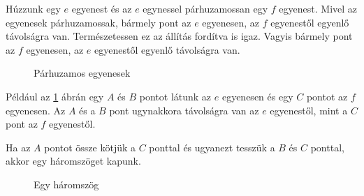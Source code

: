 \documentclass[11pt, a4paper]{article}
\begin{document}
H\'uzzunk egy $e$ egyenest \'es az $e$ egynessel p\'arhuzamossan egy $f$ egyenest. Mivel az egyenesek p\'arhuzamossak, b\'armely pont az $e$ egyenesen, az $f$ egyenest\H{o}l egyenl\H{o} t\'avols\'agra van. Term\'eszetessen ez az \'all\'it\'as ford\'itva is igaz. Vagyis b\'armely pont az $f$ egyenesen, az $e$ egyenest\H{o}l egyenl\H{o} t\'avols\'agra van.

\begin{figure}[h]
\centering
{}
\caption{P\'arhuzamos egyenesek}
\label{fig:paralel}
\end{figure}
P\'eld\'aul az \ref{fig:paralel} \'abr\'an egy $A$ \'es $B$ pontot l\'atunk az $e$ egyenesen \'es egy $C$ pontot az $f$ egyenesen. Az $A$ \'es a $B$ pont ugynakkora t\'avols\'agra van az $e$ egyenest\H{o}l, mint a $C$ pont az $f$ egyenest\H{o}l.

Ha az $A$ pontot össze kötjük a $C$ ponttal \'es ugyanezt tesszük a $B$ \'es $C$ ponttal, akkor egy h\'aromszöget kapunk.

\begin{figure}[h]
\centering
{}
\caption{Egy h\'aromszög}
\label{fig:tri1}
\end{figure}
\end{document}
